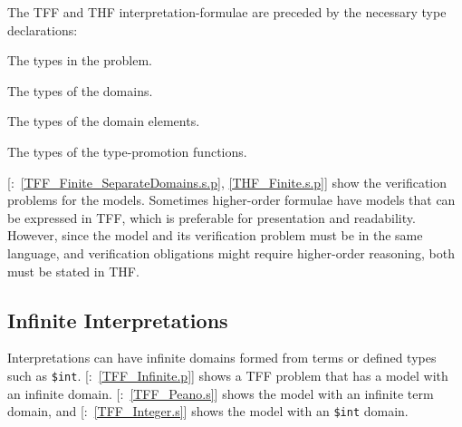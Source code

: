 \documentclass{easychair}
\newcommand{\smalltt}[1]{\small \texttt{#1}}
\newcommand{\example}{{\scriptsize \faFile[regular]}}
\newenvironment{packed_itemize}{
\vspace*{-0.3em}
\begin{itemize}
\setlength{\partopsep}{0pt}
\setlength{\itemsep}{1pt}
\setlength{\parskip}{0pt}
\setlength{\parsep}{0pt}
}{\end{itemize}}
\begin{document}
The TFF and THF interpretation-formulae are preceded by the necessary type declarations:
\begin{packed_itemize}
\item The types in the problem.
\item The types of the domains.
\item The types of the domain elements.
\item The types of the type-promotion functions.
\end{packed_itemize}

[\example{}:~\ref{TFF_Finite_SeparateDomains.s.p}, 
\ref{THF_Finite.s.p}] show the verification problems for the models.
Sometimes higher-order formulae have models that can be expressed in TFF, which is preferable for
presentation and readability. 
However, since the model and its verification problem must be in the same language, and 
verification obligations might require higher-order reasoning, both must be stated in THF.

\subsection{Infinite Interpretations}
\label{TarskianInfinite}

Interpretations can have infinite domains formed from terms or defined types such as 
\smalltt{\$int}.
[\example{}:~\ref{TFF_Infinite.p}] shows a TFF problem that has a 
model with an infinite domain.
[\example{}:~\ref{TFF_Peano.s}] shows the model with an infinite term 
domain, and [\example{}:~\ref{TFF_Integer.s}] shows the model with an
\smalltt{\$int} domain.
\end{document}
